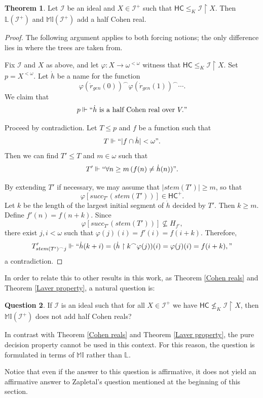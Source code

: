 \documentclass{amsart}
\theoremstyle{definition}
\newtheorem{theorem}{Theorem}[section]
\newtheorem{question}[theorem]{Question}
\theoremstyle{remark}
\numberwithin{equation}{section}
\newcommand{\hc}{\mathsf{HC}}
\newcommand{\li}{\mathbb{L}(\mathcal{I}^+)}
\newcommand{\lav}{\mathbb{L}}
\newcommand{\mil}{\mathbb{MI}}
\newcommand{\id}{\mathcal{I}}
\newcommand{\restr}[2]{#1\upharpoonright {#2}}
\begin{document}
\begin{theorem} \label{hc reals}
    Let $\id$ be an ideal and $X\in \id^+$ such that $\hc\leq_K \restr{\id}{X}$. Then $\li$ and $\mil(\id^+)$ add a half Cohen real.
\end{theorem}
\begin{proof}

The following argument applies to both forcing notions; the only difference lies in where the trees are taken from.

Fix $\id$ and $X$ as above, and let $\varphi:X\rightarrow\omega^{<\omega}$ witness that $\hc\leq_K \restr{\id}{X}$. Set $p=X^{<\omega}$. Let $\dot h$ be a name for the function 
\[
\varphi(\dot r_{gen}(0))^{\frown}\varphi(\dot r_{gen}(1))^{\frown}\cdots.
\]
We claim that 
\[
p\Vdash ``\dot h \text{ is a half Cohen real over } V." 
\]

Proceed by contradiction. Let $T\leq p$ and $f$ be a function such that 
\[
T\Vdash ``|f\cap \dot h|<\omega".
\]
Then we can find $T'\leq T$ and $m\in\omega$ such that 
\[
T'\Vdash ``\forall n\geq m\, (f(n)\neq \dot h(n))".
\]

By extending $T'$ if necessary, we may assume that $|stem(T')|\geq m$, so that
\[
\varphi[succ_{T'}(stem(T'))]\in \hc^+.
\]
Let $k$ be the length of the largest initial segment of $\dot h$ decided by $T'$. Then $k\geq m$. Define $f'(n)=f(n+k)$. Since 
\[
\varphi[succ_{T'}(stem(T'))]\not\subseteq H_{f'},
\]
there exist $j,i<\omega$ such that $\varphi(j)(i)=f'(i)=f(i+k)$. Therefore,
\[
T'_{stem(T')^\frown j}\Vdash ``\dot h(k+i)
    =(\restr{\dot h}{k}^\frown\varphi(j))(i)
    =\varphi(j)(i)
    =f(i+k),
"
\]
a contradiction.
\end{proof}

In order to relate this to other results in this work, as Theorem \ref{Cohen reals} and Theorem \ref{Laver property}, a natural question is:

\begin{question}
    If $\id$ is an ideal such that for all $X\in\id^+$ we have $\hc\not\leq_K \restr{\id}{X}$, then $\mil(\id^+)$ does not add half Cohen reals?
\end{question}

In contrast with Theorem \ref{Cohen reals} and Theorem \ref{Laver property}, the pure decision property cannot be used in this context. For this reason, the question is formulated in terms of $\mil$ rather than $\lav$.

Notice that even if the answer to this question is affirmative, it does not yield an affirmative answer to Zapletal's question mentioned at the beginning of this section.
\end{document}
